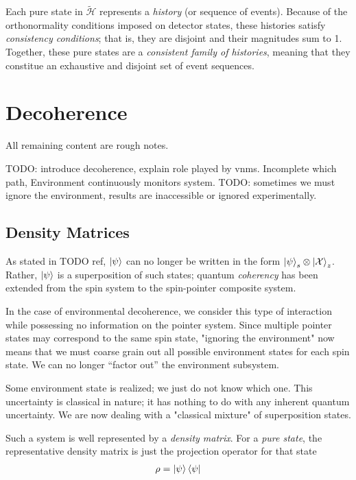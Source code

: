 Each pure state in $\widetilde{\mathcal{H}}$ represents a \textit{history} (or sequence of events). Because of the orthonormality conditions imposed on detector states, these histories satisfy \textit{consistency conditions}; that is, they are disjoint and their magnitudes sum to 1. Together, these pure states are a \textit{consistent family of histories}, meaning that they constitue an exhaustive and disjoint set of event sequences.


\chapter{Decoherence}

All remaining content are rough notes.

TODO: introduce decoherence, explain role played by vnms. Incomplete which path, Environment continuously monitors system. TODO: sometimes we must ignore the environment, results are inaccessible or ignored experimentally.

\section{Density Matrices}
As stated in TODO ref, $\ket{\psi}$ can no longer be written in the form $\ket{\psi}_s \otimes \ket{\mathcal{X}}_z$. Rather, $\ket{\psi}$ is a superposition of such states; quantum \textit{coherency} has been extended from the spin system to the spin-pointer composite system.

In the case of environmental decoherence, we consider this type of interaction while possessing no information on the pointer system. Since multiple pointer states may correspond to the same spin state, "ignoring the environment" now means that we must coarse grain out all possible environment states for each spin state. We can no longer ``factor out'' the environment subsystem.

Some environment state is realized; we just do not know which one. This uncertainty is classical in nature; it has nothing to do with any inherent quantum uncertainty. We are now dealing with a "classical mixture" of superposition states.

Such a system is well represented by a \textit{density matrix}. For a \textit{pure state}, the representative density matrix is just the projection operator for that state
\begin{align}
  \rho = \ket{\psi}\bra{\psi}
\end{align}

